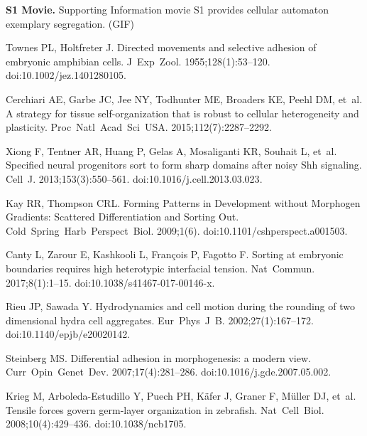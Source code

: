 \documentclass[10pt,letterpaper]{article}
\begin{document}
\clearpage

\textbf{S1 Movie.} Supporting Information movie S1 provides cellular automaton exemplary segregation. (GIF)

\clearpage

\begin{thebibliography}{10}

Townes PL, Holtfreter J.
\newblock Directed movements and selective adhesion of embryonic amphibian
  cells.
\newblock J~Exp~Zool. 1955;128(1):53--120.
\newblock doi:{10.1002/jez.1401280105}.

Cerchiari AE, Garbe JC, Jee NY, Todhunter ME, Broaders KE, Peehl DM, et~al.
\newblock A strategy for tissue self-organization that is robust to cellular
  heterogeneity and plasticity.
\newblock Proc~Natl~Acad~Sci~USA. 2015;112(7):2287--2292.

Xiong F, Tentner AR, Huang P, Gelas A, Mosaliganti KR, Souhait L, et~al.
\newblock Specified neural progenitors sort to form sharp domains after noisy
  {Shh} signaling.
\newblock Cell~J. 2013;153(3):550--561.
\newblock doi:{10.1016/j.cell.2013.03.023}.

Kay RR, Thompson CRL.
\newblock Forming {Patterns} in {Development} without {Morphogen} {Gradients}:
  {Scattered} {Differentiation} and {Sorting} {Out}.
\newblock Cold~Spring~Harb~Perspect~Biol. 2009;1(6).
\newblock doi:{10.1101/cshperspect.a001503}.

Canty L, Zarour E, Kashkooli L, Fran\c{c}ois P, Fagotto F.
\newblock Sorting at embryonic boundaries requires high heterotypic interfacial
  tension.
\newblock Nat~Commun. 2017;8(1):1--15.
\newblock doi:{10.1038/s41467-017-00146-x}.

Rieu JP, Sawada Y.
\newblock Hydrodynamics and cell motion during the rounding of two dimensional
  hydra cell aggregates.
\newblock Eur~Phys~J~B. 2002;27(1):167--172.
\newblock doi:{10.1140/epjb/e20020142}.

Steinberg MS.
\newblock Differential adhesion in morphogenesis: a modern view.
\newblock Curr~Opin~Genet~Dev. 2007;17(4):281--286.
\newblock doi:{10.1016/j.gde.2007.05.002}.

Krieg M, Arboleda-Estudillo Y, Puech PH, Käfer J, Graner F, Müller DJ, et~al.
\newblock Tensile forces govern germ-layer organization in zebrafish.
\newblock Nat~Cell~Biol. 2008;10(4):429--436.
\newblock doi:{10.1038/ncb1705}.


\end{thebibliography}
\end{document}

